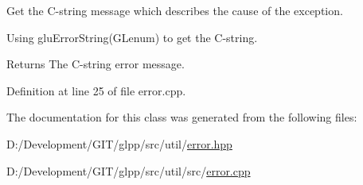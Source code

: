 Get the C-\/string message which describes the cause of the exception.

Using glu\+Error\+String(\+G\+Lenum) to get the C-\/string. 

\begin{DoxyReturn}{Returns}
The C-\/string error message. 
\end{DoxyReturn}


Definition at line 25 of file error.\+cpp.



The documentation for this class was generated from the following files\+:\begin{DoxyCompactItemize}
\item 
D\+:/\+Development/\+G\+I\+T/glpp/src/util/\hyperlink{error_8hpp}{error.\+hpp}\item 
D\+:/\+Development/\+G\+I\+T/glpp/src/util/src/\hyperlink{error_8cpp}{error.\+cpp}\end{DoxyCompactItemize}
